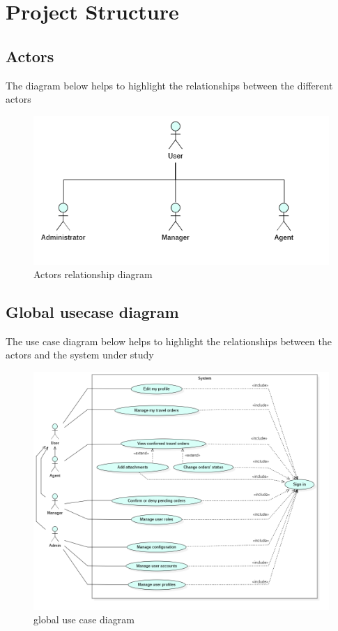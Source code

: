     \section{Project Structure}
    \subsection*{Actors}
    The diagram below helps to highlight the relationships between the different actors
     \begin{figure}[H]
    \begin{center}
        \includegraphics[scale=0.6]{img/actors.png}
        \caption{Actors relationship diagram}
    \end{center}
    \end{figure}
    \subsection*{Global usecase diagram}
    The use case diagram below helps to highlight the relationships between the actors and the system under study
    \begin{figure}[H]
    \begin{center}
        \includegraphics[scale=0.48]{img/global_usecase.png}
        \caption{global use case diagram}
    \end{center}
    \end{figure}
    
